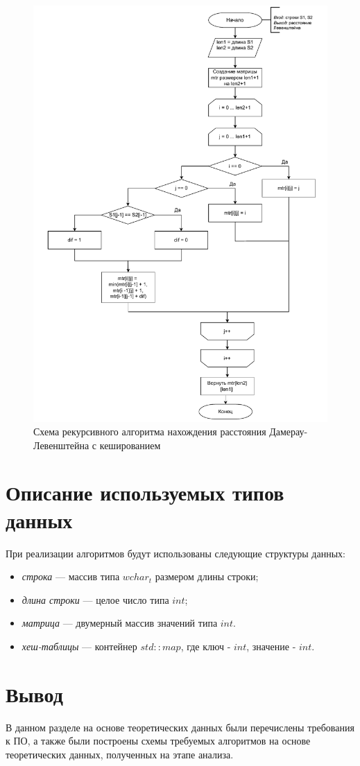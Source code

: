 \begin{figure}[h]
	\centering
	\includegraphics[height=0.9\textheight, page=4]{img/algoritms.pdf}
	\caption{Схема рекурсивного алгоритма нахождения расстояния Дамерау-Левенштейна с кешированием}
	\label{fig:DLrechash1}
\end{figure}

\clearpage

\section{Описание используемых типов данных}

При реализации алгоритмов будут использованы следующие структуры данных:

\begin{itemize}
	\item \textit{строка} --- массив типа $wchar_{t}$ размером длины строки;
	\item \textit{длина строки} --- целое число типа $int$;
	\item \textit{матрица} --- двумерный массив значений типа $int$.
        \item \textit{хеш-таблицы} --- контейнер $std::map$, где ключ - $int$, значение - $int$.
\end{itemize}

\section*{Вывод}

В данном разделе на основе теоретических данных были перечислены требования к ПО, а также были построены схемы требуемых алгоритмов на основе теоретических данных, полученных на этапе анализа.